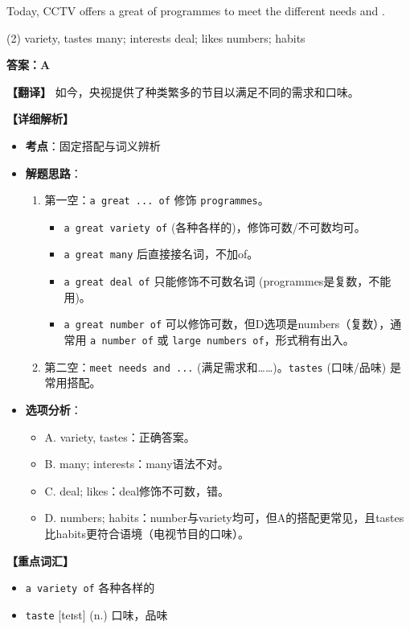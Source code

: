 \documentclass[11pt, a4paper]{article}
\newcommand{\analysis}[4]{
    \begin{solutionbox}
        \textbf{答案：#1}
        
        \textbf{【翻译】} #2
        
        \textbf{【详细解析】}
        #3
        
        \textbf{【重点词汇】}
        #4
    \end{solutionbox}
}
\newcommand{\blank}{\underline{\hspace{1.5cm}}}
\begin{document}
\begin{questions}
    \item Today, CCTV offers a great \blank of programmes to meet the different needs and \blank.
    \begin{tasks}(2)
        \task variety, tastes \task many; interests
        \task deal; likes \task numbers; habits
    \end{tasks}
    \analysis{A}{如今，央视提供了种类繁多的节目以满足不同的需求和口味。}{
        \begin{itemize}
            \item \textbf{考点}：固定搭配与词义辨析
            \item \textbf{解题思路}：
                \begin{enumerate}
                    \item 第一空：\texttt{a great ... of} 修饰 \texttt{programmes}。
                        \begin{itemize}
                            \item \texttt{a great variety of} (各种各样的)，修饰可数/不可数均可。
                            \item \texttt{a great many} 后直接接名词，不加of。
                            \item \texttt{a great deal of} 只能修饰不可数名词 (programmes是复数，不能用)。
                            \item \texttt{a great number of} 可以修饰可数，但D选项是numbers（复数），通常用 \texttt{a number of} 或 \texttt{large numbers of}，形式稍有出入。
                        \end{itemize}
                    \item 第二空：\texttt{meet needs and ...} (满足需求和……)。\texttt{tastes} (口味/品味) 是常用搭配。
                \end{enumerate}
            \item \textbf{选项分析}：
                \begin{itemize}
                    \item A. variety, tastes：正确答案。
                    \item B. many; interests：many语法不对。
                    \item C. deal; likes：deal修饰不可数，错。
                    \item D. numbers; habits：number与variety均可，但A的搭配更常见，且tastes比habits更符合语境（电视节目的口味）。
                \end{itemize}
        \end{itemize}
    }{
        \begin{itemize}
            \item \texttt{a variety of} 各种各样的
            \item \texttt{taste} [teɪst] (n.) 口味，品味
        \end{itemize}
    }


\end{questions}
\end{document}
